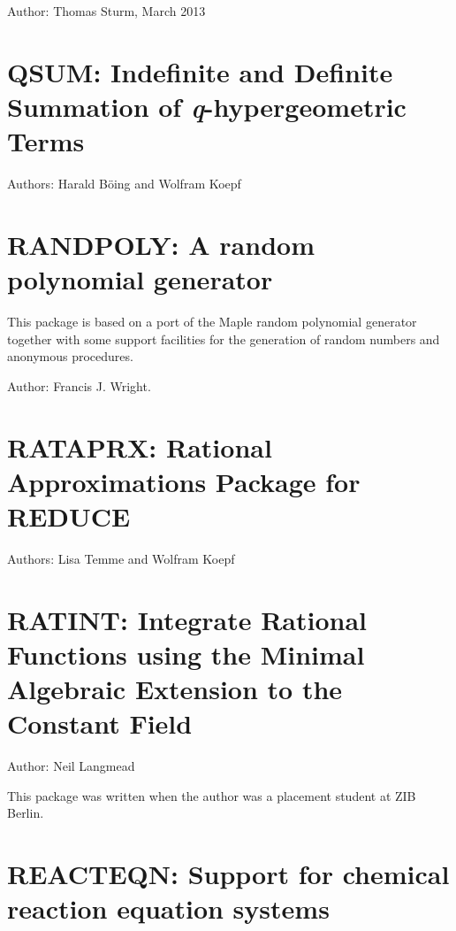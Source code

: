 Author: Thomas Sturm, March 2013

\newpage


\section{QSUM: Indefinite and Definite Summation
of \textsl{q}-hypergeometric Terms}

Authors: Harald B\"{o}ing and Wolfram Koepf



\newpage

\section{RANDPOLY: A random polynomial generator} 

This package is based on a port of the Maple random polynomial
generator together with some support facilities for the generation
of random numbers and anonymous procedures.

Author: Francis J. Wright.



\newpage

\section{RATAPRX: Rational Approximations Package for REDUCE}

Authors: Lisa Temme and Wolfram Koepf



\newpage

\section{RATINT: Integrate Rational Functions using the Minimal Algebraic                                                                                                                           Extension to the Constant Field}

Author: Neil Langmead

This package was written when the author was a placement student at ZIB Berlin.




\section{REACTEQN: Support for chemical reaction equation systems}

